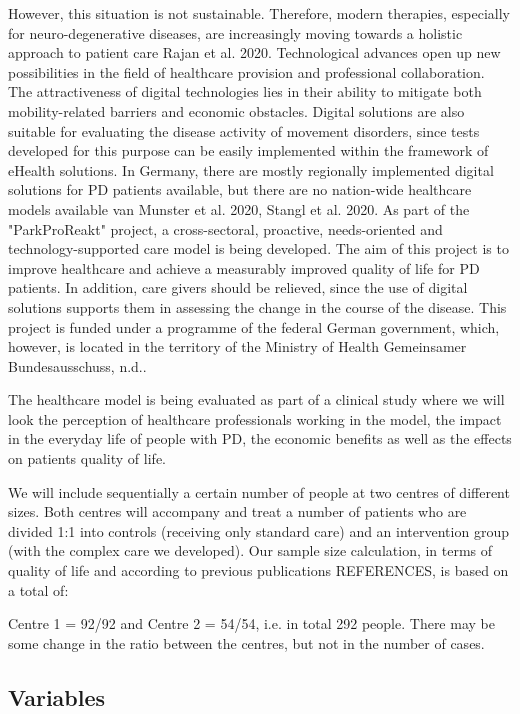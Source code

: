\documentclass[number,12pt,review]{elsarticle}
\begin{document}
However, this situation is not sustainable. Therefore, modern therapies, especially for neuro-degenerative diseases, are increasingly moving towards a holistic approach to patient care Rajan et al. 2020. Technological advances open up new possibilities in the field of healthcare provision and professional collaboration. The attractiveness of digital technologies lies in their ability to mitigate both mobility-related barriers and economic obstacles. Digital solutions are also suitable for evaluating the disease activity of movement disorders, since tests developed for this purpose can be easily implemented within the framework of eHealth solutions. In Germany, there are  mostly regionally implemented digital solutions for PD patients available, but there are no nation-wide healthcare models available van Munster et al. 2020, Stangl et al. 2020.
As part of the "ParkProReakt" project, a cross-sectoral, proactive, needs-oriented and technology-supported care model is being developed. The aim of this project is to improve healthcare and achieve a measurably improved quality of life for PD patients. In addition, care givers should be relieved, since the use of digital solutions supports them in assessing the change in the course of the disease. This project is funded under a programme of the federal German government, which, however, is located in the territory of the Ministry of Health Gemeinsamer Bundesausschuss, n.d.. 

The healthcare model is being evaluated as part of a clinical study where we will look the perception of healthcare professionals working in the model, the impact in the everyday life of people with PD, the economic benefits as well as the effects on patients quality of life.

We will include sequentially a certain number of people at two centres of different sizes. Both centres will accompany and treat a number of patients who are divided 1:1 into controls (receiving only standard care) and an intervention group (with the complex care we developed). Our sample size calculation, in terms of quality of life and according to previous publications REFERENCES, is based on a total of:

Centre 1 = 92/92 and Centre 2 = 54/54, i.e. in total 292 people. There may be some change
in the ratio between the centres, but not in the number of cases.


\subsection{Variables}
\end{document}
